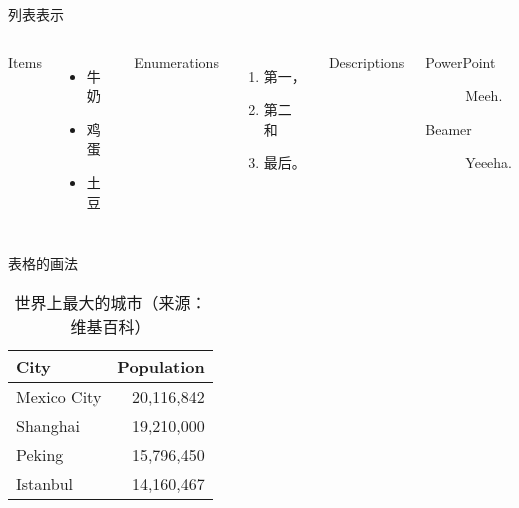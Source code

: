 \documentclass{kw}
\begin{document}
\begin{frame}{列表表示}
	\begin{columns}[T,onlytextwidth]
		Items
		\begin{itemize}
			\item 牛奶 \item 鸡蛋 \item 土豆
		\end{itemize}
		
		Enumerations
		\begin{enumerate}
			\item 第一，\item 第二 和 \item 最后。
		\end{enumerate}
		
		Descriptions
		\begin{description}
			\item[PowerPoint] Meeh. \item[Beamer] Yeeeha.
		\end{description}
	\end{columns}
\end{frame}
\begin{frame}{表格的画法}
	\begin{table}
		\caption{世界上最大的城市（来源：维基百科）}
		\begin{tabular}{@{} lr @{}}
			\toprule
			City & Population\\
			\midrule
			Mexico City & 20,116,842\\
			Shanghai & 19,210,000\\
			Peking & 15,796,450\\
			Istanbul & 14,160,467\\
			\bottomrule
		\end{tabular}
	\end{table}
\end{frame}
\end{document}
